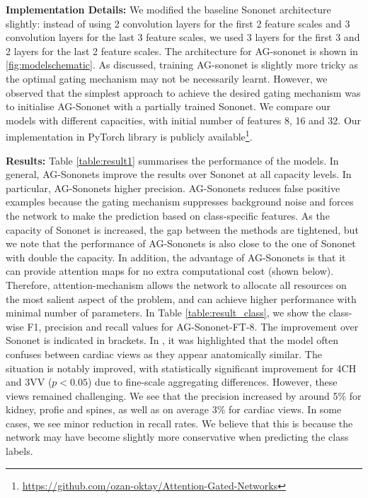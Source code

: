 \documentclass{article}
\begin{document}
\textbf{Implementation Details:} We modified the baseline Sononet architecture slightly: instead of using 2 convolution layers for the first 2 feature scales and 3 convolution layers for the last 3 feature scales, we used 3 layers for the first 3 and 2 layers for the last 2 feature scales. The architecture for AG-sononet is shown in \ref{fig:modelschematic}. As discussed, training AG-sononet is slightly more tricky as the optimal gating mechanism may not be necessarily learnt. However, we observed that the simplest approach to achieve the desired gating mechanism was to initialise AG-Sononet with a partially trained Sononet. We compare our models with different capacities, with initial number of features 8, 16 and 32. Our implementation in PyTorch library is publicly available\footnote{\url{https://github.com/ozan-oktay/Attention-Gated-Networks}}.

\textbf{Results:} Table \ref{table:result1} summarises the performance of the models. In general, AG-Sononets improve the results over Sononet at all capacity levels. In particular, AG-Sononets higher precision. AG-Sononets reduces false positive examples because the gating mechanism suppresses background noise and forces the network to make the prediction based on class-specific features.  As the capacity of Sononet is increased, the gap between the methods are tightened, but we note that the performance of AG-Sononets is also close to the one of Sononet with double the capacity. In addition, the advantage of AG-Sononets is that it can provide attention maps for no extra computational cost (shown below). Therefore, attention-mechanism allows the network to allocate all resources on the most salient aspect of the problem, and can achieve higher performance with minimal number of parameters. In Table \ref{table:result_class}, we show the class-wise F1, precision and recall values for AG-Sononet-FT-8. The improvement over Sononet is indicated in brackets. In \cite{baumgartner2016real}, it was highlighted that the model often confuses between cardiac views as they appear anatomically similar. The situation is notably improved, with statistically significant improvement for 4CH and 3VV ($p<0.05$) due to fine-scale aggregating differences. However, these views remained challenging. We see that the precision increased by around 5\% for kidney, profie and spines, as well as on average 3\% for cardiac views. In some cases, we see minor reduction in recall rates. We believe that this is because the network may have become slightly more conservative when predicting the class labels.
\end{document}
